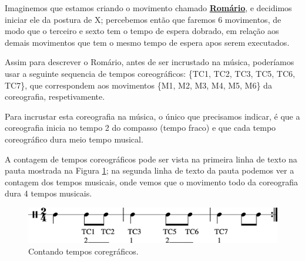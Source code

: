 \begin{example}
Imaginemos que estamos criando o movimento chamado \hyperref[subsec:passo:romario]{\textbf{Romário}},
e decidimos iniciar ele da postura de X; percebemos então que faremos 6 movimentos,
de modo que o terceiro e sexto tem o tempo de espera dobrado, 
em relação aos demais movimentos que tem o mesmo tempo de espera apos serem executados.

Assim para descrever o Romário, antes de ser incrustado na música, 
poderíamos usar a seguinte sequencia de tempos coreográficos: \{TC1, TC2, TC3, TC5, TC6, TC7\},
que correspondem aos movimentos \{M1, M2, M3, M4, M5, M6\} da coreografia, respetivamente.

Para incrustar esta coreografia na música, o único que precisamos indicar,
é que a coreografia inicia no tempo 2 do compasso (tempo fraco)
e que cada tempo coreográfico dura meio tempo musical.

A contagem de tempos coreográficos pode ser vista na primeira linha de texto na pauta mostrada na Figura \ref{fig:contagemtempocoreografico};
na segunda linha de texto da pauta podemos ver a contagem dos tempos musicais,
onde vemos que o movimento todo da coreografia dura 4 tempos musicais.
\end{example}

\begin{figure}[!h]
    \centering
    \includegraphics[width=\textwidth]{chapters/cap-musicalidade/abc-contagemtempocoreografico-1.eps}

    \vspace{-10pt}
    \caption{Contando tempos coregráficos.}
    \label{fig:contagemtempocoreografico}
\end{figure}

